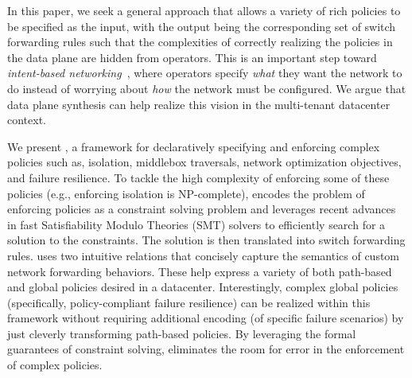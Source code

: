 

In this paper, we seek a general approach that allows a variety
of rich policies to be specified as the input, with the output being
the corresponding set of switch forwarding rules such that the
complexities of correctly realizing the policies in the data plane are
hidden from operators. This is an important step toward {\em
  intent-based networking}~\cite{intent}, where operators specify {\em
  what} they want the network to do instead of worrying about {\em
  how} the network must be configured.
We argue that data plane synthesis can help 
realize this vision in the multi-tenant datacenter
context.

We present \Name, a framework for declaratively specifying and
enforcing complex policies such as, isolation, middlebox traversals,
network optimization objectives, and failure resilience. To tackle the
high complexity of enforcing some of these policies (e.g.,
enforcing isolation is NP-complete), \Name encodes the problem
of enforcing policies as a constraint solving problem 
and leverages recent advances in fast
Satisfiability Modulo Theories (SMT) solvers to efficiently search for
a solution to the constraints. The solution is then translated into
switch forwarding rules. \Name uses two intuitive relations that
concisely capture the semantics of custom network forwarding
behaviors. These help express a variety of both path-based and global
policies desired in a datacenter. Interestingly, complex global policies (specifically,
policy-compliant failure resilience) can be realized within this
framework without requiring additional encoding (of specific failure
scenarios) by just cleverly transforming path-based policies.
By leveraging the formal guarantees of constraint solving, \Name
eliminates the room for error in the enforcement of complex
policies.

